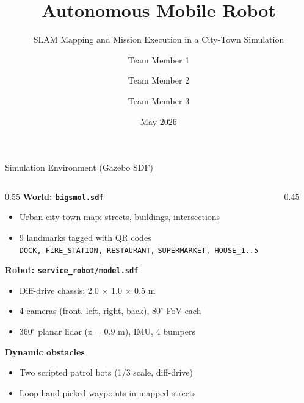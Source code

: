 \documentclass[10pt,aspectratio=169]{beamer}
\title[AMR Phase 1 \& 2]{Autonomous Mobile Robot}
\subtitle{SLAM Mapping and Mission Execution in a City-Town Simulation}
\author[Team]{Team Member 1 \and Team Member 2 \and Team Member 3}
\institute[]{Course Name --- Course Code}
\date{May 2026}
\begin{document}
\begin{frame}
  \titlepage
\end{frame}

\begin{frame}{Simulation Environment (Gazebo SDF)}
  \begin{columns}[T]
    \begin{column}{0.55\textwidth}
      \textbf{World: \texttt{bigsmol.sdf}}
      \begin{itemize}
        \item Urban city-town map: streets, buildings, intersections
        \item 9 landmarks tagged with QR codes \\
              \texttt{DOCK, FIRE\_STATION, RESTAURANT,}
              \texttt{SUPERMARKET, HOUSE\_1..5}
      \end{itemize}
      \vspace{0.4em}
      \textbf{Robot: \texttt{service\_robot/model.sdf}}
      \begin{itemize}
        \item Diff-drive chassis: 2.0 $\times$ 1.0 $\times$ 0.5 m
        \item 4 cameras (front, left, right, back), 80$^{\circ}$ FoV each
        \item 360$^{\circ}$ planar lidar (z = 0.9 m), IMU, 4 bumpers
      \end{itemize}
      \vspace{0.4em}
      \textbf{Dynamic obstacles}
      \begin{itemize}
        \item Two scripted patrol bots (1/3 scale, diff-drive)
        \item Loop hand-picked waypoints in mapped streets
      \end{itemize}
    \end{column}
    \begin{column}{0.45\textwidth}
      \centering
    \end{column}
  \end{columns}
\end{frame}
\end{document}
